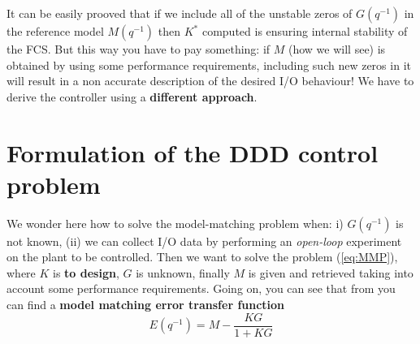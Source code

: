 \noindent
It can be easily prooved that if we include all of the unstable zeros of $G(q^{-1})$ in the reference model $M(q^{-1})$ then $K^*$ computed is ensuring internal stability of the FCS. But this way you have to pay something: if $M$ (how we will see) is obtained by using some performance requirements, including such new zeros in it will result in a non accurate description of the desired I/O behaviour! We have to derive the controller using a \textbf{different approach}.

\section{Formulation of the DDD control problem}
We wonder here how to solve the model-matching problem when: i) $G(q^{-1})$ is not known, (ii) we can collect I/O data by performing an \textit{open-loop} experiment on the plant to be controlled. Then we want to solve the problem (\ref{eq:MMP}), where $K$ is \textbf{to design}, $G$ is unknown, finally $M$ is given and retrieved taking into account some performance requirements. Going on, you can see that from  you can find a \textbf{model matching error transfer function}
\begin{equation}
    E(q^{-1})=M-\frac{KG}{1+KG}
\end{equation}

